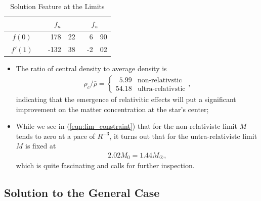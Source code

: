 \documentclass[a4paper,11pt]{article}
\numberwithin{equation}{section}
\numberwithin{table}{section}
\numberwithin{figure}{section}
\begin{document}
			\begin{table}[htbp]
				\centering
				\caption{Solution Feature at the Limits}
				\begin{tabular}{cr@{.}lr@{.}l}
					\toprule
					& \multicolumn{2}{c}{\quad\quad$f_n$\quad\quad} & \multicolumn{2}{c}{\quad\quad$f_u$\quad\quad} \\
					\midrule
					\multicolumn{1}{c}{~$f(0)$\quad} & ~~~178 & 22 & \quad~~6 & 90 \\
					\multicolumn{1}{c}{~$f'(1)$\quad} & -132 & 38 & -2 & 02 \\
					\bottomrule
				\end{tabular}%
				\label{tab:lim_sol_feat}%
			\end{table}%
			\begin{itemize}
				\item The ratio of central density to average density is 
				\begin{align}
					\rho_c/\bar{\rho}=\begin{cases}
						\phantom{0}5.99 & \textrm{non-relativstic} \\
						54.18 & \textrm{ultra-relativstic}
					\end{cases}, 
				\end{align}
				indicating that the emergence of relativitic effects will put a significant improvement on the matter concentration at the star's center;
				\item While we see in (\ref{eqn:lim_constraint}) that for the non-relativistc limit $M$ tends to zero at a pace of $R^{-3}$, it turns out that for the untra-relativistc limit $M$ is fixed at
				\begin{align}
					2.02M_0=1.44M_{\astrosun},
				\end{align}
				which is quite fascinating and calls for further inspection.
			\end{itemize}
		
		
		\subsection{Solution to the General Case}
			\label{sct:solution_general}
			
\end{document}
